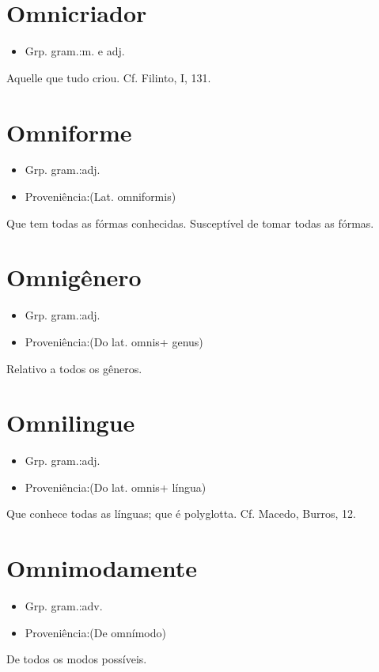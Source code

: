 \section{Omnicriador}
\begin{itemize}
\item {Grp. gram.:m.  e  adj.}
\end{itemize}
Aquelle que tudo criou. Cf. Filinto, I, 131.
\section{Omniforme}
\begin{itemize}
\item {Grp. gram.:adj.}
\end{itemize}
\begin{itemize}
\item {Proveniência:(Lat. \textunderscore omniformis\textunderscore )}
\end{itemize}
Que tem todas as fórmas conhecidas.
Susceptível de tomar todas as fórmas.
\section{Omnigênero}
\begin{itemize}
\item {Grp. gram.:adj.}
\end{itemize}
\begin{itemize}
\item {Proveniência:(Do lat. \textunderscore omnis\textunderscore  + \textunderscore genus\textunderscore )}
\end{itemize}
Relativo a todos os gêneros.
\section{Omnilingue}
\begin{itemize}
\item {Grp. gram.:adj.}
\end{itemize}
\begin{itemize}
\item {Proveniência:(Do lat. \textunderscore omnis\textunderscore  + \textunderscore língua\textunderscore )}
\end{itemize}
Que conhece todas as línguas; que é polyglotta. Cf. Macedo, \textunderscore Burros\textunderscore , 12.
\section{Omnimodamente}
\begin{itemize}
\item {Grp. gram.:adv.}
\end{itemize}
\begin{itemize}
\item {Proveniência:(De \textunderscore omnímodo\textunderscore )}
\end{itemize}
De todos os modos possíveis.
